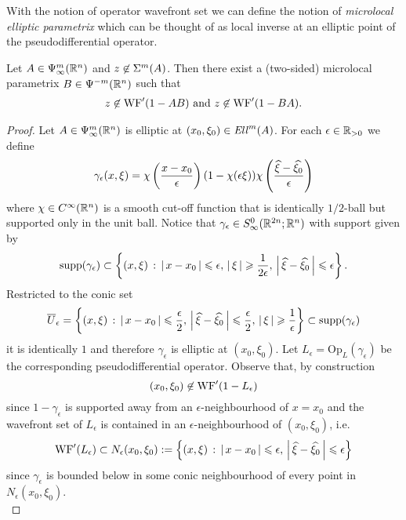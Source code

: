 \documentclass[12pt]{article}
\begin{document}
With the notion of operator wavefront set  we can define the notion of \emph{microlocal elliptic parametrix} which can be thought of as local inverse at an elliptic point of the pseudodifferential operator. 
\begin{fprop}
    Let $A \in \Psi^m_\infty({\mathbb R}^n)$ and $z \not \in \Sigma^m(A)$. Then there exist a (two-sided) microlocal parametrix $B \in \Psi^{-m}({\mathbb R}^n)$ such that 
    \begin{align*}
        z \not \in \mathrm{WF}'(1 - AB) \text{   and   } z \not \in \mathrm{WF}'(1 - BA). 
    \end{align*}
    
\end{fprop}
\begin{proof}
    Let $A \in \Psi^m_\infty({\mathbb R}^n)$ is elliptic at $(x_0, \xi_0) \in \mathit{Ell}^m(A)$. For each $\epsilon \in {\ensuremath {\mathbb R}}_{> 0}$ we define
    \begin{align*}
        \gamma_\epsilon(x, \xi) = \chi\left(\frac{x - x_0}{\epsilon}\right) (1 - \chi(\epsilon \xi)) \chi\left(\frac{\widehat{\xi} - \widehat{\xi_0}}{\epsilon}\right)
    \end{align*}
    where $\chi \in C^\infty({\mathbb R}^n)$ is a smooth cut-off function that is identically $1/2$-ball but supported only in the unit ball. Notice that $\gamma_\epsilon \in S^{0}_\infty({\mathbb R}^{2n}; {\mathbb R}^n)$ with support given by 
    \[
    \mathrm{supp}(\gamma_\epsilon) \subset \left\{(x, \xi) \, : \, \left|\, x - x_0\,\right| \leqslant \epsilon,\, \left|\, \xi\,\right| \geqslant\frac{1}{2 \epsilon},\, \left|\, \widehat{\xi} - \widehat{\xi_0}\,\right| \leqslant \epsilon \right\}. 
    \]
    Restricted to the conic set
    \[
    \overline{U}_{\epsilon} = \left\{(x, \xi) \, : \, \left|\, x - x_0\,\right| \leqslant \frac{\epsilon}{2}, \, \left|\, \widehat{\xi} - \widehat{\xi_0}\,\right| \leqslant \frac{\epsilon}{2}, \, \left|\, \xi\,\right| \geqslant \frac{1}{\epsilon}\right\} \subset \mathrm{supp}(\gamma_\epsilon)
    \]
    it is identically $1$ and therefore $\gamma_\epsilon$ is elliptic at $(x_0, \xi_0)$. Let $L_\epsilon = \mathrm{Op}_L(\gamma_\epsilon)$ be the corresponding pseudodifferential operator. Observe that, by construction 
    \[
    (x_0, \xi_0) \not\in \mathrm{WF}'(1 - L_\epsilon)
    \]
    since $1 - \gamma_\epsilon$ is supported away from an $\epsilon$-neighbourhood of $x = x_0$ and the wavefront set of $L_\epsilon$ is contained in an $\epsilon$-neighbourhood of $(x_0, \xi_0)$, i.e. 
    \[
    \mathrm{WF}'(L_\epsilon) \subset N_\epsilon(x_0, \xi_0) := \left\{(x, \xi) \, : \, \left|\, x - x_0\,\right| \leqslant \epsilon, \, \left|\, \widehat{\xi} - \widehat{\xi_0}\,\right| \leqslant \epsilon \right\}
    \]
    since $\gamma_\epsilon$ is bounded below in some conic neighbourhood of every point in $N_\epsilon(x_0, \xi_0)$. \\

\end{proof}
\end{document}
